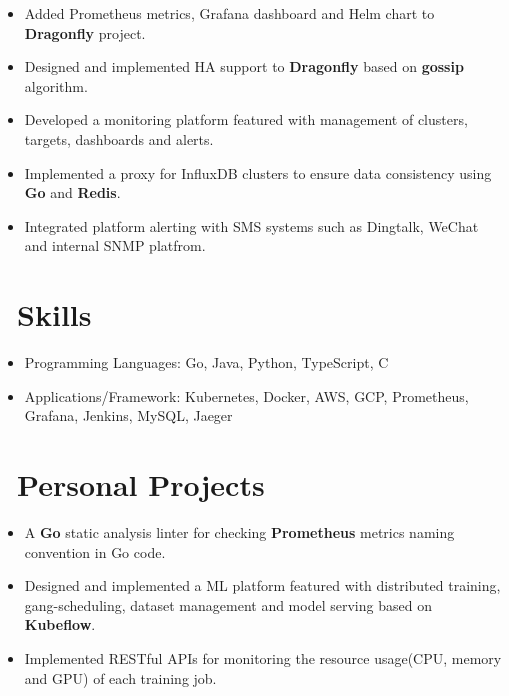 \documentclass{resume}
\begin{document}
\begin{itemize}
  \item Added Prometheus metrics, Grafana dashboard and Helm chart to \textbf{Dragonfly} project.
  \item Designed and implemented HA support to \textbf{Dragonfly} based on \textbf{gossip} algorithm. 
\end{itemize}

\begin{itemize}
  \item Developed a monitoring platform featured with management of clusters, targets, dashboards and alerts.
  \item Implemented a proxy for InfluxDB clusters to ensure data consistency using \textbf{Go} and \textbf{Redis}.
  \item Integrated platform alerting with SMS systems such as Dingtalk, WeChat and internal SNMP platfrom.
\end{itemize}

\section{\faKey\ Skills}
\begin{itemize}[parsep=0.5ex]
  \item Programming Languages: Go, Java, Python, TypeScript, C
  \item Applications/Framework: Kubernetes, Docker, AWS, GCP, Prometheus, Grafana, Jenkins, MySQL, Jaeger
\end{itemize}

\section{\faCogs\ Personal Projects}
\begin{itemize}
  \item A \textbf{Go} static analysis linter for checking \textbf{Prometheus} metrics naming convention in Go code.
\end{itemize}

\begin{itemize}
  \item Designed and implemented a ML platform featured with distributed training, gang-scheduling, dataset management and model serving based on \textbf{Kubeflow}.
  \item Implemented RESTful APIs for monitoring the resource usage(CPU, memory and GPU) of each training job.
\end{itemize}
\end{document}
